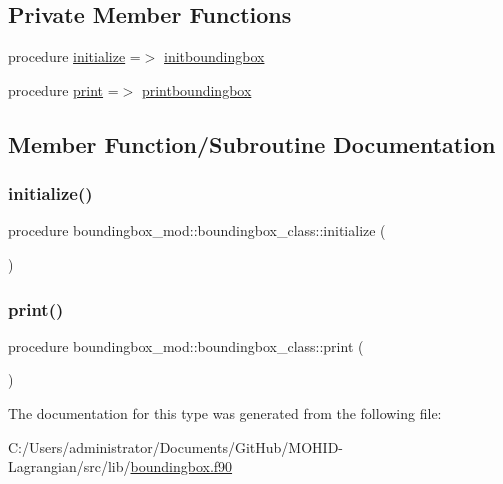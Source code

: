 \subsection*{Private Member Functions}
\begin{DoxyCompactItemize}
\item 
procedure \hyperlink{structboundingbox__mod_1_1boundingbox__class_a21f88c3fc204dab330d98c85728994c1}{initialize} =$>$ \hyperlink{namespaceboundingbox__mod_a35e41bb92c19802441dd8d748c3acfb4}{initboundingbox}
\item 
procedure \hyperlink{structboundingbox__mod_1_1boundingbox__class_aac90c83bef1a3156893cc0cb5d5647e6}{print} =$>$ \hyperlink{namespaceboundingbox__mod_a6ec461b758bc180dc72b5fb23169feca}{printboundingbox}
\end{DoxyCompactItemize}


\subsection{Member Function/\+Subroutine Documentation}
\mbox{\label{structboundingbox__mod_1_1boundingbox__class_a21f88c3fc204dab330d98c85728994c1}} 
\subsubsection{\texorpdfstring{initialize()}{initialize()}}
{\footnotesize\ttfamily procedure boundingbox\+\_\+mod\+::boundingbox\+\_\+class\+::initialize (\begin{DoxyParamCaption}{ }\end{DoxyParamCaption})\hspace{0.3cm}{\ttfamily [private]}}

\mbox{\label{structboundingbox__mod_1_1boundingbox__class_aac90c83bef1a3156893cc0cb5d5647e6}} 
\subsubsection{\texorpdfstring{print()}{print()}}
{\footnotesize\ttfamily procedure boundingbox\+\_\+mod\+::boundingbox\+\_\+class\+::print (\begin{DoxyParamCaption}{ }\end{DoxyParamCaption})\hspace{0.3cm}{\ttfamily [private]}}



The documentation for this type was generated from the following file\+:\begin{DoxyCompactItemize}
\item 
C\+:/\+Users/administrator/\+Documents/\+Git\+Hub/\+M\+O\+H\+I\+D-\/\+Lagrangian/src/lib/\hyperlink{boundingbox_8f90}{boundingbox.\+f90}\end{DoxyCompactItemize}
